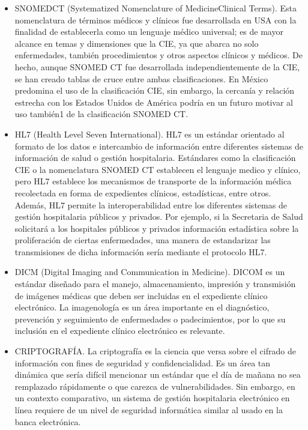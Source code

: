\begin{itemize}
  \item SNOMEDCT (Systematized Nomenclature of MedicineClinical Terms). Esta nomenclatura de términos médicos y clínicos fue desarrollada en USA con la finalidad de establecerla como un lenguaje médico universal; es de mayor alcance en temas y dimensiones que la CIE, ya que abarca no solo enfermedades, también procedimientos y otros aspectos clínicos y médicos. De hecho, aunque SNOMED CT fue desarrollada independientemente de la CIE, se han creado tablas de cruce entre ambas clasificaciones. En México predomina el uso de la clasificación CIE, sin embargo, la cercanía y relación estrecha con los Estados Unidos de América podría en un futuro motivar al uso también1 de la clasificación SNOMED CT. \cite{marco2}
  \item HL7 (Health Level Seven International). HL7 es un estándar orientado al formato de los datos e intercambio de información entre diferentes sistemas de información de salud o gestión hospitalaria. Estándares como la clasificación CIE o la nomenclatura SNOMED CT establecen el lenguaje medico y clínico, pero HL7 establece los mecanismos de transporte de la información médica recolectada en forma de expedientes clínicos, estadísticas, entre otros. Además, HL7 permite la interoperabilidad entre los diferentes sistemas de gestión hospitalaria públicos y privados. Por ejemplo, si la Secretaria de Salud solicitará a los hospitales públicos y privados información estadística sobre la proliferación de ciertas enfermedades, una manera de estandarizar las transmisiones de dicha información sería mediante el protocolo HL7. \cite{marco2}
  \item DICM (Digital Imaging and Communication in Medicine). DICOM es un estándar diseñado para el manejo, almacenamiento, impresión y transmisión de imágenes médicas que deben ser incluidas en el expediente clínico electrónico. La imagenología es un área importante en el diagnóstico, prevención y seguimiento de enfermedades o padecimientos, por lo que su inclusión en el expediente clínico electrónico es relevante.\cite{marco2}
  \item CRIPTOGRAFÍA. La criptografía es la ciencia que versa sobre el cifrado de información con fines de seguridad y confidencialidad. Es un área tan dinámica que sería difícil mencionar un estándar que el día de mañana no sea remplazado rápidamente o que carezca de vulnerabilidades. Sin embargo, en un contexto comparativo, un sistema de gestión hospitalaria electrónico en línea requiere de un nivel de seguridad informática similar al usado en la banca electrónica.
\end{itemize}

